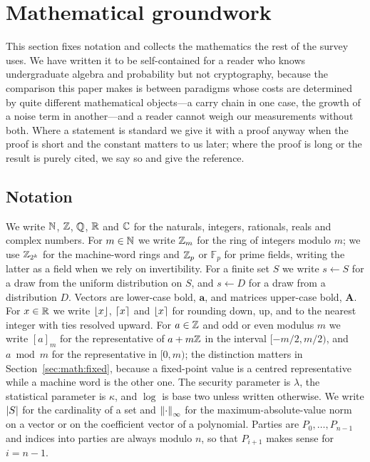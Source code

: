 \section{Mathematical groundwork}
\label{sec:math}

This section fixes notation and collects the mathematics the rest of the survey
uses. We have written it to be self-contained for a reader who knows
undergraduate algebra and probability but not cryptography, because the
comparison this paper makes is between paradigms whose costs are determined by
quite different mathematical objects---a carry chain in one case, the growth of a
noise term in another---and a reader cannot weigh our measurements without both.
Where a statement is standard we give it with a proof anyway when the proof is
short and the constant matters to us later; where the proof is long or the result
is purely cited, we say so and give the reference.

\subsection{Notation}
\label{sec:math:notation}

\begin{notation}
\label{not:basic}
We write $\mathbb{N}$, $\mathbb{Z}$, $\mathbb{Q}$, $\mathbb{R}$ and $\mathbb{C}$ for the naturals, integers,
rationals, reals and complex numbers. For $m \in \mathbb{N}$ we write $\mathbb{Z}_m$ for the
ring of integers modulo $m$; we use $\mathbb{Z}_{2^k}$ for the machine-word rings and
$\mathbb{Z}_p$ or $\mathbb{F}_p$ for prime fields, writing the latter as a field when we
rely on invertibility. For a finite set $S$ we write $s \gets S$ for a draw from
the uniform distribution on $S$, and $s \gets D$ for a draw from a distribution
$D$. Vectors are lower-case bold, $\mathbf{a}$, and matrices upper-case bold,
$\mathbf{A}$. For $x \in \mathbb{R}$ we write $\left\lfloor x \right\rfloor$, $\left\lceil x \right\rceil$ and $\left\lfloor x \right\rceil$
for rounding down, up, and to the nearest integer with ties resolved upward.
For $a \in \mathbb{Z}$ and odd or even modulus $m$ we write $[a]_m$ for the
representative of $a + m\mathbb{Z}$ in the  interval
$[-m/2, m/2)$, and $a \bmod m$ for the representative in $[0,m)$; the
distinction matters in Section~\ref{sec:math:fixed}, because a fixed-point value
is a centred representative while a machine word is the other one.
The security parameter is $\lambda$, the statistical parameter is $\kappa$, and
$\log$ is base two unless written otherwise. We write $\left\lvert S \right\rvert$ for the
cardinality of a set and $\left\lVert \cdot \right\rVert_\infty$ for the maximum-absolute-value
norm on a vector or on the coefficient vector of a polynomial. Parties are
$P_0,\dots,P_{n-1}$ and indices into parties are always modulo $n$, so that
$P_{i+1}$ makes sense for $i = n-1$.
\end{notation}

